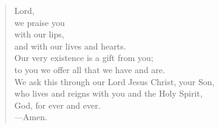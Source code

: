\prayer

\setlength{\vleftmargin}{\prayerleftmargini}

\begin{verse}
Lord,\\
we praise you\\
with our lips,\\
and with our lives and hearts.\\
Our very existence is a gift from you;\\
to you we offer all that we have and are.\\
We ask this through our Lord Jesus Christ, your Son,\\
who lives and reigns with you and the Holy Spirit,\\
God, for ever and ever.\\
{\color{red}---\thinspace}Amen.
\end{verse}

\setlength{\vleftmargin}{\defleftmargini}